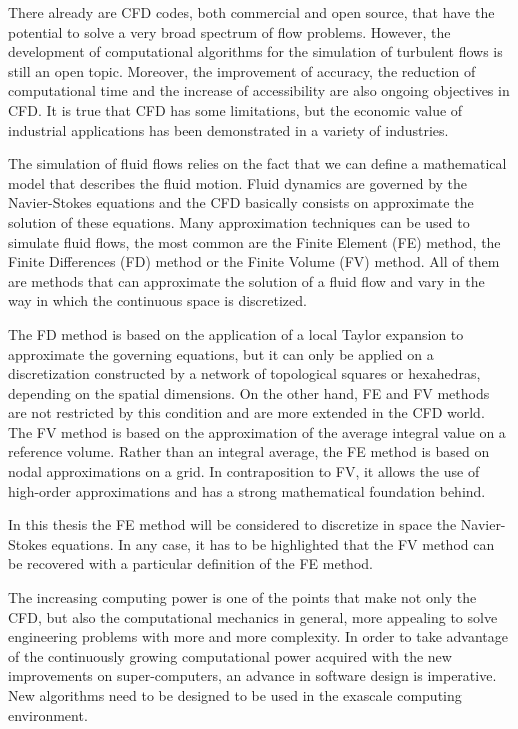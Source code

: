 There already are CFD codes, both commercial and open source, that have the potential to solve a very broad spectrum of flow problems. However, the development of computational algorithms for the simulation of turbulent flows is still an open topic. Moreover, the improvement of accuracy, the reduction of computational time and the increase of accessibility are also ongoing objectives in CFD. It is true that CFD has some limitations, but the economic value of industrial applications has been demonstrated in a variety of industries.

The simulation of fluid flows relies on the fact that we can define a mathematical model that describes the fluid motion. Fluid dynamics are governed by the Navier-Stokes equations and the CFD basically consists on approximate the solution of these equations. Many approximation techniques can be used to simulate fluid flows, the most common are the Finite Element (FE) method, the Finite Differences (FD) method or the Finite Volume (FV) method. All of them are methods that can approximate the solution of a fluid flow and vary in the way in which the continuous space is discretized. 

The FD method is based on the application of a local Taylor expansion to approximate the governing equations, but it can only be applied on a discretization constructed by a network of topological squares or hexahedras, depending on the spatial dimensions. On the other hand, FE and FV methods are not restricted by this condition and are more extended in the CFD world. The FV method is based on the approximation of the average integral value on a reference volume. Rather than an integral average, the FE method is based on nodal approximations on a grid. In contraposition to FV, it allows the use of high-order approximations and has a strong mathematical foundation behind.

In this thesis the FE method will be considered to discretize in space the Navier-Stokes equations. In any case, it has to be highlighted that the FV method can be recovered with a particular definition of the FE method.

The increasing computing power is one of the points that make not only the CFD, but also the computational mechanics in general, more appealing to solve engineering problems with more and more complexity. In order to take advantage of the continuously growing computational power acquired with the new improvements on super-computers, an advance in software design is imperative. New algorithms need to be designed to be used in the exascale computing environment. 

